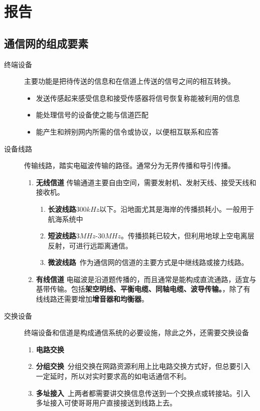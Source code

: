 
\section{报告}
\subsection{通信网的组成要素}
\begin{description}
 	\item[终端设备] 主要功能是把待传送的信息和在信道上传送的信号之间的相互转换。
	\begin{itemize}
		\item 发送传感起来感受信息和接受传感器将信号恢复称能被利用的信息
		\item 能处理信号的设备使之能与信道匹配
		\item 能产生和辨别网内所需的信令或协议，以便相互联系和应答
	\end{itemize}
	\item[设备线路] 传输线路，踏实电磁波传输的路径。通常分为无界传播和导引传播。
	\begin{enumerate}
		\item\textbf{无线信道} 传输通道主要自由空间，需要发射机、发射天线、接受天线和接收机。
		\begin{enumerate}
			\item \textbf{长波线路}300$kHz$以下。沿地面尤其是海岸的传播损耗小。一般用于航海系统中
			\item \textbf{短波线路}3$MHz$-30$MHz$。传播损耗已较大，但利用地球上空电离层反射，可进行远距离通信。
			\item \textbf{微波线路}\ 作为通信网的信道的主要方式是中继线路或接力线路。
		\end{enumerate}
		\item \textbf{有线信道} 电磁波是沿道题传播的，而且通常是能构成直流通路，适宜与基带传输。包括\textbf{架空明线、平衡电缆、同轴电缆、波导传输。}，除了有线线路还需要增加\textbf{增音器和均衡器}。
	\end{enumerate}
	\item[交换设备] 终端设备和信道是构成通信系统的必要设施，除此之外，还需要交换设备
	\begin{enumerate}
		\item \textbf{电路交换}
		\item \textbf{分组交换}\ 分组交换在网路资源利用上比电路交换方式好，但总要引入一定延时，所以对实时要求高的如电话通信不利。
		\item \textbf{多址接入}\ 上两者都需要讲交换信息传送到一个交换点或转接站。引入多址接入可使哥哥用户直接接送到线路上去。
	\end{enumerate}
\end{description}
